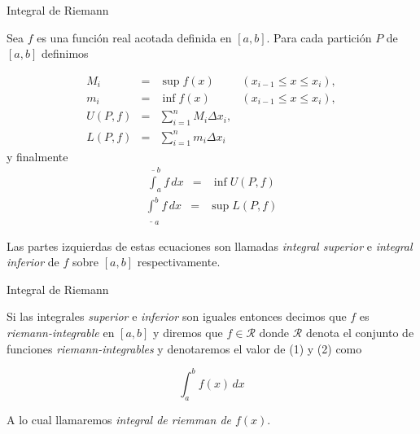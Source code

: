 \documentclass[11pt]{beamer}
\begin{document}
\begin{frame}{Integral de Riemann}

\begin{definition}[2]
Sea $f$ es una función real acotada definida en $[a, b]$. Para cada partición $P$ de $[a, b]$ definimos

\begin{equation*}
	\begin{array}{rcll}
		M_i & = & \sup f(x) & (x_{i-1} \leq x \leq x_i), \\
		m_i & = & \inf f(x) & (x_{i-1} \leq x \leq x_i), \\
		U(P, f) & = & \sum_{i=1}^n M_i \Delta x_i , \\
		L(P, f) & = & \sum_{i=1}^n m_i \Delta x_i
	\end{array}
\end{equation*}
y finalmente
\begin{equation}
	\begin{array}{rcl}
		\overline{\int}_a^b f\,dx & = & \inf U(P, f)
	\end{array}
\end{equation}
\begin{equation}
	\begin{array}{rcl}
		\underline{\int}_a^b f\,dx & = & \sup L(P, f)
	\end{array}
\end{equation}

Las partes izquierdas de estas ecuaciones son llamadas \textit{integral superior} e \textit{integral inferior} de $f$ sobre $[a, b]$ respectivamente.
\end{definition}

\end{frame}

\begin{frame}{Integral de Riemann}

\begin{definition}[3]
Si las integrales \textit{superior} e \textit{inferior} son iguales entonces decimos que $f$ es \textit{riemann-integrable} en $[a, b]$ y diremos que $f\in \mathcal{R}$ donde $\mathcal{R}$ denota el conjunto de funciones \textit{riemann-integrables} y denotaremos el valor de (1) y (2) como

\begin{equation}
	\int_a^b f(x)\,dx
\end{equation}

A lo cual llamaremos \textit{integral de riemman de $f(x)$}.
\end{definition}

\end{frame}
\end{document}
